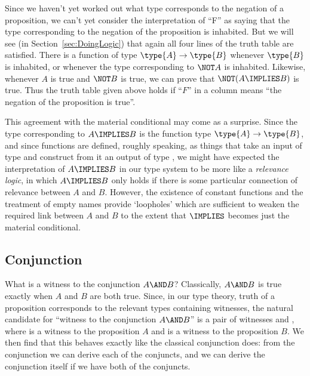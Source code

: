 Since we haven't yet worked out what type corresponds to the negation of a proposition, we can't yet consider the interpretation of ``F'' as saying that the type corresponding to the negation of the proposition is inhabited.  But we will see (in Section~\ref{sec:DoingLogic}) that again all four lines of the truth table are satisfied.  There is a function of type $\type{A} \to \type{B}$ whenever $\type{B}$ is inhabited, or whenever the type corresponding to $\NOT A$ is inhabited.  Likewise, whenever $A$ is true and $\NOT B$ is true, we can prove that $\NOT (A \IMPLIES B)$ is true.  Thus the truth table given above holds if ``$F$'' in a column means ``the negation of the proposition is true''.

This agreement with the material conditional may come as a surprise.  Since the type corresponding to 
$A \IMPLIES B$ is the function type $\type{A} \to \type{B}$, and since functions are defined, roughly speaking, as things that take an input of type  and construct from it an output of type , we might have expected the interpretation of $A \IMPLIES B$ in our type system to be more like a \emph{relevance logic}, in which $A \IMPLIES B$ only holds if there is some particular connection of relevance between $A$ and $B$.  However, the existence of constant functions 
and the treatment of empty names 
provide `loopholes' which are sufficient to weaken the required link between $A$ and $B$ to the extent that $\IMPLIES$ becomes just the material conditional.






\subsection{Conjunction}
\label{sec:Logic-Conjunction}

What is a witness to the conjunction $A \AND B$?  Classically, $A \AND B$ is true exactly when $A$ and $B$ are both true.
Since, in our type theory, truth of a proposition corresponds to the relevant types containing witnesses, the natural candidate for ``witness to the conjunction $A \AND B$'' is a pair of witnesses  and , where 
 is a witness to the proposition $A$ and 
 is a witness to the proposition $B$.  We then find that this behaves exactly like the classical conjunction does: 
from the conjunction we can derive each of the conjuncts, and we can derive the conjunction itself if we have both of the conjuncts.

